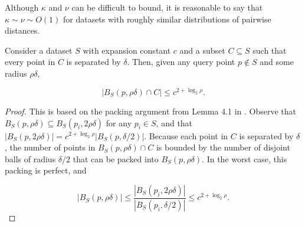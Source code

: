Although $\kappa$ and $\nu$ can be difficult to bound, it is reasonable to
say that $\kappa \sim \nu \sim O(1)$ for datasets with roughly similar
distributions of pairwise distances.

\begin{lemma}
Consider a dataset $S$ with expansion constant $c$ and a subset $C \subseteq S$
such that every point in $C$ is separated by $\delta$.  Then, given any query
point $p \not\in S$ and some radius $\rho \delta$,

\begin{equation}
| B_S(p, \rho \delta) \cap C | \le c^{2 + \log_2 \rho}.
\end{equation}
\label{lem:packing}
\end{lemma}

\begin{proof}
This is based on the packing argument from Lemma 4.1 in \cite{langford2006}.
Observe that $B_S(p, \rho \delta) \subseteq B_S(p_i, 2 \rho \delta)$ for any
$p_i \in S$, and that $| B_S(p, 2 \rho \delta) | = c^{2 + \log_2 \rho} |
B_S(p, \delta / 2) |$.  Because each point in $C$ is separated by $\delta$, the
number of points in $B_S(p, \rho \delta) \cap C$ is
bounded by the number of disjoint balls of radius $\delta / 2$ that can be
packed into $B_S(p, \rho \delta)$.  In the worst case, this packing is
perfect, and

\begin{equation}
|B_S(p, \rho \delta)| \le \frac{|B_S(p_i, 2 \rho \delta)|}{|B_S(p_i, \delta
/ 2)|} \le c^{2 + \log_2 \rho}.
\end{equation}\end{proof}
